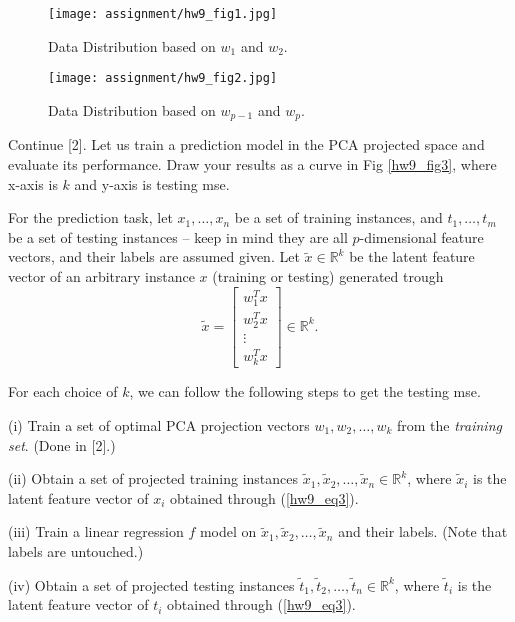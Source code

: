 \documentclass{llncs}
\begin{document}
\begin{figure}[h!] 
\centering 
\texttt{[image: assignment/hw9\_fig1.jpg]} 
\caption{Data Distribution based 
on $w_{1}$ and $w_{2}$.} 
\label{hw9_fig1}
\end{figure}

\begin{figure}[h!] 
\centering 
\texttt{[image: assignment/hw9\_fig2.jpg]} 
\caption{Data Distribution based 
on $w_{p-1}$ and $w_{p}$.} 
\label{hw9_fig2}
\end{figure}

\newpage 

Continue [2]. 
Let us train a prediction model 
in the PCA projected space and evaluate 
its performance. Draw your results as a curve in Fig \ref{hw9_fig3}, where 
x-axis is $k$ and y-axis is testing mse.

For the prediction task, let $x_{1},
\ldots, x_{n}$ be a set of training instances, and $t_{1}, \ldots, t_{m}$ 
be a set of testing instances -- 
keep in mind they are all 
$p$-dimensional feature vectors, 
and their labels are assumed given. 
Let $\tilde{x} \in \mathbb{R}^{k}$ 
be the latent feature vector
of an arbitrary instance $x$ 
(training or testing) generated trough 
\begin{equation}
\label{hw9_eq3}
\tilde{x} = 
\begin{bmatrix}
w_{1}^{T} x\\
w_{2}^{T} x\\
\vdots\\ 
w_{k}^{T} x 
\end{bmatrix} \in \mathbb{R}^{k}. 
\end{equation}

For each choice of $k$, we can 
follow the following steps to 
get the testing mse. 

(i) Train a set of optimal  
PCA projection vectors $w_{1}, 
w_{2}, \ldots, w_{k}$ from the 
\textit{training set}. (Done 
in [2].)

(ii) Obtain a set of projected 
training instances 
$\tilde{x}_{1}, \tilde{x}_{2}, \ldots, 
\tilde{x}_{n} \in \mathbb{R}^{k}$, 
where $\tilde{x}_{i}$ is the latent 
feature vector of $x_{i}$ obtained 
through (\ref{hw9_eq3}). 

(iii) Train a linear regression $f$
model on $\tilde{x}_{1}, \tilde{x}_{2}, \ldots, \tilde{x}_{n}$ and their labels. 
(Note that labels are untouched.)  

(iv) Obtain a set of projected 
testing instances 
$\tilde{t}_{1}, \tilde{t}_{2}, \ldots, 
\tilde{t}_{n} \in \mathbb{R}^{k}$, 
where $\tilde{t}_{i}$ is the latent 
feature vector of $t_{i}$ obtained 
through (\ref{hw9_eq3}). 
\end{document}
